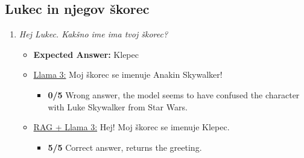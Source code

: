 \documentclass[fleqn,moreauthors,10pt]{ds_report}
\begin{document}
\begin{appendices}
\begin{enumerate}
            \end{enumerate}



            
        

        
        
        \subsection{Lukec in njegov škorec}
            \begin{enumerate}
                \item  \textit{Hej Lukec. Kakšno ime ima tvoj škorec?}
                \begin{itemize}
                    \item \textbf{Expected Answer:} Klepec
                    \item \underline{Llama 3:} Moj škorec se imenuje Anakin Skywalker!
                    \begin{itemize}
                        \item \textbf{0/5} Wrong answer, the model seems to have confused the character with Luke Skywalker from Star Wars.
                    \end{itemize}
                    \item \underline{RAG + Llama 3:} Hej! Moj škorec se imenuje Klepec.
                    \begin{itemize}
                        \item \textbf{5/5} Correct answer, returns the greeting. 
                    \end{itemize}
                \end{itemize}



\end{enumerate}
\end{appendices}
\end{document}
